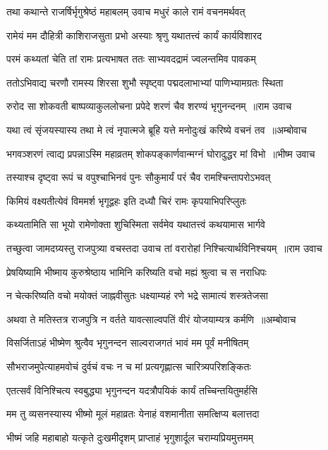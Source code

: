 \twolineshloka
{तथा कथान्ते राजर्षिर्भृगुश्रेष्ठं महाबलम्}
{उवाच मधुरं काले रामं वचनमर्थवत्}


\twolineshloka
{रामेयं मम दौहित्री काशिराजसुता प्रभो}
{अस्याः श्रृणु यथातत्त्वं कार्यं कार्यविशारद}


\twolineshloka
{परमं कथ्यतां चेति तां रामः प्रत्यभाषत}
{ततः साभ्यवदद्रामं ज्वलन्तमिव पावकम्}


\twolineshloka
{ततोऽभिवाद्य चरणौ रामस्य शिरसा शुभौ}
{स्पृष्ट्वा पद्मदलाभाभ्यां पाणिभ्यामग्रतः स्थिता}


\threelineshloka
{रुरोद सा शोकवती बाष्पव्याकुललोचना}
{प्रपेदे शरणं चैव शरण्यं भृगुनन्दनम् ॥राम उवाच}
{}


\threelineshloka
{यथा त्वं सृंजयस्यास्य तथा मे त्वं नृपात्मजे}
{ब्रूहि यत्ते मनोदुःखं करिष्ये वचनं तव ॥अम्बोवाच}
{}


\threelineshloka
{भगवञ्शरणं त्वाद्य प्रपन्नाऽस्मि महाव्रतम्}
{शोकपङ्कार्णवान्मग्नं घोरादुद्धर मां विभो ॥भीष्म उवाच}
{}


\twolineshloka
{तस्याश्च दृष्ट्वा रूपं च वपुश्चाभिनवं पुनः}
{सौकुमार्यं परं चैव रामश्चिन्तापरोऽभवत्}


\twolineshloka
{किमियं वक्ष्यतीत्येवं विममर्श भृगूद्वहः}
{इति दध्यौ चिरं रामः कृपयाभिपरिप्लुतः}


\twolineshloka
{कथ्यतामिति सा भूयो रामेणोक्ता शुचिस्मिता}
{सर्वमेव यथातत्त्वं कथयामास भार्गवे}


\threelineshloka
{तच्छुत्वा जामदग्र्यस्तु राजपुत्र्या वचस्तदा}
{उवाच तां वरारोहां निश्चित्यार्थविनिश्चयम् ॥राम उवाच}
{}


\twolineshloka
{प्रेषयिष्यामि भीष्माय कुरुश्रेष्ठाय भामिनि}
{करिष्यति वचो मह्यं श्रुत्वा च स नराधिपः}


\twolineshloka
{न चेत्करिष्यति वचो मयोक्तं जाह्नवीसुतः}
{धक्ष्याम्यहं रणे भद्रे सामात्यं शस्त्रतेजसा}


\threelineshloka
{अथवा ते मतिस्तत्र राजपुत्रि न वर्तते}
{यावत्साल्वपतिं वीरं योजयाम्यत्र कर्मणि ॥अम्बोवाच}
{}


\twolineshloka
{विसर्जिताऽहं भीष्मेण श्रुत्वैव भृगुनन्दन}
{साल्वराजगतं भावं मम पूर्वं मनीषितम्}


\twolineshloka
{सौभराजमुपेत्याहमवोचं दुर्वचं वचः}
{न च मां प्रत्यगृह्णात्स चारित्र्यपरिशङ्कितः}


\twolineshloka
{एतत्सर्वं विनिश्चित्य स्वबुद्ध्या भृगुनन्दन}
{यदत्रौपयिकं कार्यं तच्चिन्तयितुमर्हसि}


\twolineshloka
{मम तु व्यसनस्यास्य भीष्मो मूलं महाव्रतः}
{येनाहं वशमानीता समत्क्षिप्य बलात्तदा}


\twolineshloka
{भीष्मं जहि महाबाहो यत्कृते दुःखमीदृशम्}
{प्राप्ताहं भृगुशार्दूल चराम्यप्रियमुत्तमम्}



